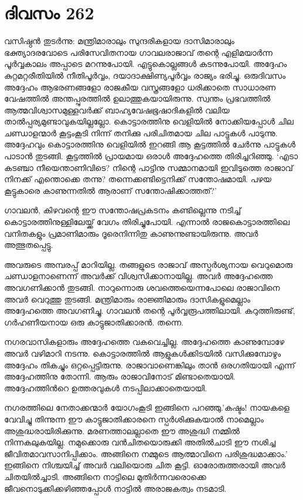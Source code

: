 \section{ദിവസം 262}


വസിഷ്ഠന്‍ തുടര്‍ന്നു: മന്ത്രിമാരാലും സുന്ദരികളായ ദാസിമാരാലും ഭക്ത്യാദരവോടെ പരിസേവിതനായ ഗാവലരാജാവ് തന്റെ എളിമയാര്‍ന്ന പൂര്‍വ്വകാലം അപ്പാടെ മറന്നുപോയി. എട്ടുകൊല്ലങ്ങള്‍ കടന്നുപോയി. അദ്ദേഹം കുറ്റമറ്റരീതിയില്‍ നീതിപൂര്‍വ്വം, ദയാദാക്ഷിണ്യപൂര്‍വ്വം രാജ്യം ഭരിച്ചു. ഒരുദിവസം അദ്ദേഹം ആഭരണങ്ങളോ രാജകീയ വസ്ത്രങ്ങളോ ധരിക്കാതെ സാധാരണ വേഷത്തില്‍ അന്തപ്പുരത്തില്‍ ഉലാത്തുകയായിരുന്നു. സ്വന്തം പ്രഭവത്തില്‍ ആത്മവിശ്വാസമുള്ളവര്‍ക്ക് ബാഹ്യവേഷഭൂഷാദികളില്‍ വലിയ താല്‍പ്പര്യമുണ്ടാവുകയില്ലല്ലോ. 
കൊട്ടാരത്തിനു വെളിയില്‍ നോക്കിയപ്പോള്‍ ചില ചണ്ഡാളന്മാര്‍ കൂട്ടംകൂടി നിന്ന്  തനിക്കു പരിചിതമായ ചില പാട്ടുകള്‍ പാടുന്നു. അദ്ദേഹവും കൊട്ടാരത്തിനു വെളിയില്‍ ഇറങ്ങി  ആ കൂട്ടത്തില്‍ ചേര്‍ന്നു പാട്ടുകള്‍ പാടാന്‍ തുടങ്ങി. കൂട്ടത്തില്‍ പ്രായമായ ഒരാള്‍ അദ്ദേഹത്തെ തിരിച്ചറിഞ്ഞു. ‘എടാ കടഞ്ചാ നീയെന്താണിവിടെ? നിന്റെ പാട്ടിനു സമ്മാനമായി ഇവിടുത്തെ രാജാവ് നിനക്ക് എന്തൊക്കെ തന്നു? തന്നെക്കണ്ടിട്ടെനിക്ക് സന്തോഷമായി. പഴയ കൂട്ടുകാരെ കാണുന്നതില്‍ ആരാണ് സന്തോഷിക്കാത്തത്?’

ഗാവലന്‍, കിഴവന്റെ ഈ സന്തോഷപ്രകടനം കണ്ടില്ലെന്നു നടിച്ച് കൊട്ടാരത്തിനുള്ളിലേയ്ക്ക് വേഗം തിരിച്ചുപോയി. എന്നാല്‍ രാജകൊട്ടാരത്തിലെ വനിതകളും പ്രമാണിമാരും ദൂരെനിന്നിതു കാണുന്നുണ്ടായിരുന്നു. അവര്‍ അത്ഭുതപ്പെട്ടു.  

അവരുടെ അമ്പരപ്പ് മാറിയില്ല. തങ്ങളുടെ രാജാവ് അസ്പര്‍ശ്യനായ വെറുമൊരു ചണ്ഡാളനാണെന്ന്  അവര്‍ക്ക് വിശ്വസിക്കാനായില്ല. അവര്‍ അദ്ദേഹത്തെ അവഗണിക്കാന്‍ തുടങ്ങി. നാറുന്നൊരു ശവത്തെയെന്നപോലെ രാജാവിനെ അവര്‍ വെറുത്തു തുടങ്ങി. മന്ത്രിമാരും രാജ്ഞിമാരും ദാസികളുമെല്ലാം അദ്ദേഹത്തെ അവഗണിച്ചു. ഗാവലന്‍ തന്റെ പൂര്‍വ്വരൂപത്തിലായി. കറുത്തിരുണ്ട്, ഗര്‍ഹണീയനായ ഒരു കാട്ടുജാതിക്കാരന്‍. തന്നെ.

നഗരവാസികളാരും അദ്ദേഹത്തെ വകവെച്ചില്ല. അദ്ദേഹത്തെ കാണുമ്പോഴേ അവര്‍ വഴിമാറി നടന്നു. കൊട്ടാരത്തില്‍ ആളുകള്‍ക്കിടയില്‍ വസിക്കുമ്പോഴും അദ്ദേഹം തികച്ചും ഒറ്റപ്പെട്ടിരുന്നു. രാജാവാണെങ്കിലും താന്‍ ഒരഗതിയായി എന്ന് അദ്ദേഹത്തിനു തോന്നി. ആരും രാജാവിനോട് മിണ്ടാതെയായി. അദ്ദേഹത്തിന്‍റെ ഉത്തരവുകള്‍ നടപ്പിലാക്കാതെയായി.

നഗരത്തിലെ നേതാക്കന്മാര്‍ യോഗംകൂടി ഇങ്ങിനെ പറഞ്ഞു.’കഷ്ടം! നായകളെ വേവിച്ചു തിന്നുന്ന ഈ കാട്ടുജാതിക്കാരനെ സ്പര്‍ശിക്കുകയാല്‍ നാമെല്ലാം അശുദ്ധരായിരിക്കുന്നു. മരണത്താലല്ലാതെ ഈ അശുദ്ധി നമ്മില്‍ നിന്നകലുകയില്ല. നമുക്കൊരു വന്‍ചിതയൊരുക്കി അതില്‍ചാടി ഈ നശിച്ച ജീവിതമാവസാനിപ്പിക്കാം. അങ്ങിനെ നമ്മുടെ ആത്മാവിനെ പരിശുദ്ധമാക്കാം.’ ഇങ്ങിനെ നിശ്ചയിച്ച് അവര്‍ വലിയൊരു ചിത കൂട്ടി. ഓരോരുത്തരായി അവര്‍ ചിതയില്‍ച്ചാടി. അങ്ങിനെ നാട്ടിലെ മുതിര്‍ന്നവരൊക്കെ ജീവനൊടുക്കിക്കഴിഞ്ഞപ്പോള്‍ നാട്ടില്‍ അരാജകത്വം നടമാടി.

